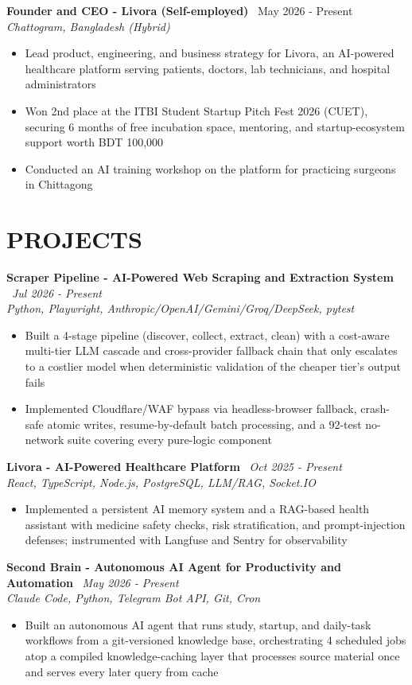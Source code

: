 \documentclass[10.5pt,a4paper]{article}
\newenvironment{tightitemize}{
  \begin{itemize}[leftmargin=15pt, itemsep=1pt, parsep=0pt, topsep=2pt]
}{
  \end{itemize}
}
\newcommand{\entry}[3]{%
  \textbf{#1} \textbar\ #2\\
  \textit{#3}%
}
\newcommand{\entrysimple}[2]{%
  \textbf{#1} \textbar\ \textit{#2}\\[1pt]
}
\begin{document}
\entry{Founder and CEO - Livora (Self-employed)}{May 2026 - Present}{Chattogram, Bangladesh (Hybrid)}
\begin{tightitemize}
  \item Lead product, engineering, and business strategy for Livora, an AI-powered healthcare platform serving patients, doctors, lab technicians, and hospital administrators
  \item Won 2nd place at the ITBI Student Startup Pitch Fest 2026 (CUET), securing 6 months of free incubation space, mentoring, and startup-ecosystem support worth BDT 100,000
  \item Conducted an AI training workshop on the platform for practicing surgeons in Chittagong
\end{tightitemize}

\section*{PROJECTS}

\entrysimple{Scraper Pipeline - AI-Powered Web Scraping and Extraction System}{Jul 2026 - Present}
\textit{Python, Playwright, Anthropic/OpenAI/Gemini/Groq/DeepSeek, pytest}
\begin{tightitemize}
  \item Built a 4-stage pipeline (discover, collect, extract, clean) with a cost-aware multi-tier LLM cascade and cross-provider fallback chain that only escalates to a costlier model when deterministic validation of the cheaper tier's output fails
  \item Implemented Cloudflare/WAF bypass via headless-browser fallback, crash-safe atomic writes, resume-by-default batch processing, and a 92-test no-network suite covering every pure-logic component
\end{tightitemize}

\entrysimple{Livora - AI-Powered Healthcare Platform}{Oct 2025 - Present}
\textit{React, TypeScript, Node.js, PostgreSQL, LLM/RAG, Socket.IO}
\begin{tightitemize}
  \item Implemented a persistent AI memory system and a RAG-based health assistant with medicine safety checks, risk stratification, and prompt-injection defenses; instrumented with Langfuse and Sentry for observability
\end{tightitemize}

\entrysimple{Second Brain - Autonomous AI Agent for Productivity and Automation}{May 2026 - Present}
\textit{Claude Code, Python, Telegram Bot API, Git, Cron}
\begin{tightitemize}
  \item Built an autonomous AI agent that runs study, startup, and daily-task workflows from a git-versioned knowledge base, orchestrating 4 scheduled jobs atop a compiled knowledge-caching layer that processes source material once and serves every later query from cache
\end{tightitemize}
\end{document}
